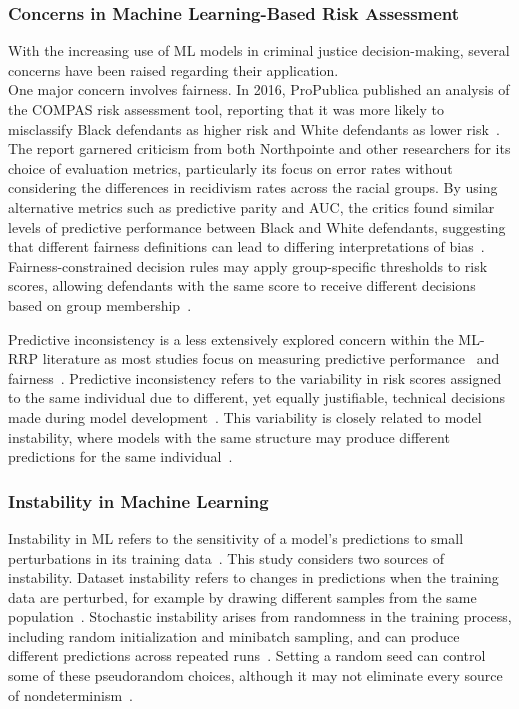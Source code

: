 \documentclass[12pt]{article}
\begin{document}
\subsubsection{Concerns in Machine Learning-Based Risk Assessment}
\tabto{2em} With the increasing use of ML models in criminal justice decision-making, several concerns have been raised regarding their application.\\

One major concern involves fairness. In 2016, ProPublica published an analysis of the COMPAS risk assessment tool, reporting that it was more likely to misclassify Black defendants as higher risk and White defendants as lower risk~\cite{propublica2016analysis}. The report garnered criticism from both Northpointe and other researchers for its choice of evaluation metrics, particularly its focus on error rates without considering the differences in recidivism rates across the racial groups. By using alternative metrics such as predictive parity and AUC, the critics found similar levels of predictive performance between Black and White defendants, suggesting that different fairness definitions can lead to differing interpretations of bias~\cite{dieterich2016compas, corbett2017algorithmic, flores2016false}. Fairness-constrained decision rules may apply group-specific thresholds to risk scores, allowing defendants with the same score to receive different decisions based on group membership~\cite{corbett2017algorithmic}.

Predictive inconsistency is a less extensively explored concern within the ML-RRP literature as most studies focus on measuring predictive performance~\cite{duwe2017out, travaini2022machine, tollenaar2013method} and fairness~\cite{ tolan2019machine, dressel2018accuracy,ngo2018traditional}. Predictive inconsistency refers to the variability in risk scores assigned to the same individual due to different, yet equally justifiable, technical decisions made during model development~\cite{greene2022forks}. This variability is closely related to model instability, where models with the same structure may produce different predictions for the same individual~\cite{greene2022forks}.

\subsubsection{Instability in Machine Learning}
\tabto{2em} Instability in ML refers to the sensitivity of a model's predictions to small perturbations in its training data~\cite{sun2015stability}. This study considers two sources of instability. Dataset instability refers to changes in predictions when the training data are perturbed, for example by drawing different samples from the same population~\cite{riley2023stability}. Stochastic instability arises from randomness in the training process, including random initialization and minibatch sampling, and can produce different predictions across repeated runs~\cite{lopez2022instability}. Setting a random seed can control some of these pseudorandom choices, although it may not eliminate every source of nondeterminism~\cite{lopez2022instability}.\\
\end{document}
